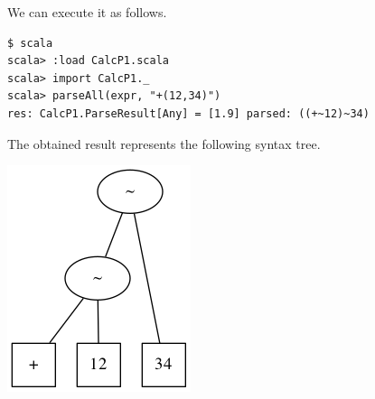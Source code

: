 \documentclass[11pt]{article}
\begin{document}
We can execute it as follows. 
\begin{verbatim}
$ scala
scala> :load CalcP1.scala
scala> import CalcP1._
scala> parseAll(expr, "+(12,34)")
res: CalcP1.ParseResult[Any] = [1.9] parsed: ((+~12)~34)
\end{verbatim}

The obtained result represents the following syntax tree. 

\includegraphics[width=.9\linewidth]{images/scala-parse-tree2.png}
\end{document}
